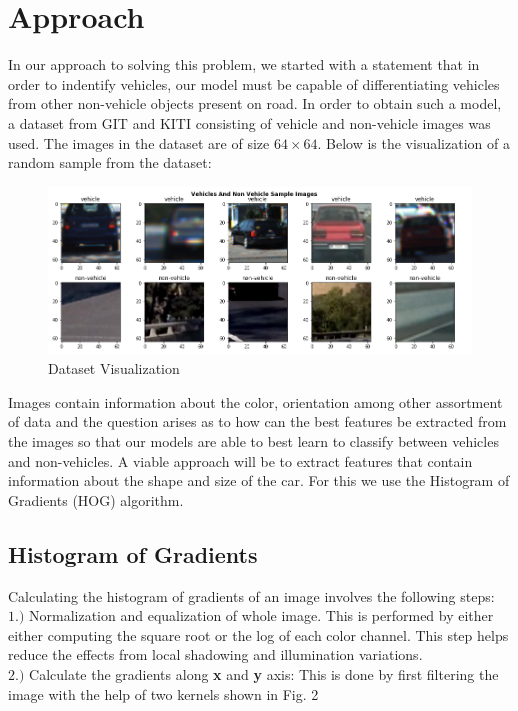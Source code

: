 \documentclass{article}
\begin{document}
\section{Approach}
In our approach to solving this problem, we started with a statement that in order to indentify vehicles, our model must be capable of differentiating vehicles from other non-vehicle objects present on road. In order to obtain such a model, a dataset from GIT\cite{Arrspide2012} and KITI\cite{Fritsch2013ITSC} consisting of vehicle and non-vehicle images was used. The images in the dataset are of size $64\times64$. Below is the visualization of a random sample from the dataset:

\begin{figure}[h]
\centering
\includegraphics[width=\textwidth]{plots_pics.png}
\caption{Dataset Visualization}
\end{figure}

Images contain information about the color, orientation among other assortment of data and the question arises as to how can the best features be extracted from the images so that our models are able to best learn to classify between vehicles and non-vehicles. A viable approach will be to extract features that contain information about the shape and size of the car. For this we use the Histogram of Gradients (HOG) \cite{1501.02058} algorithm.

\subsection{Histogram of Gradients}
Calculating the histogram of gradients of an image involves the following steps:\\
$1.)$ Normalization and equalization of whole image. This is performed by either either computing the square root or the log of each color channel\cite{1501.02058}. This step helps reduce the effects from local shadowing and illumination variations.\\
$2.)$ Calculate the gradients along \textbf{x} and \textbf{y} axis: This is done by first filtering the image with the help of two kernels shown in Fig. 2
\end{document}
